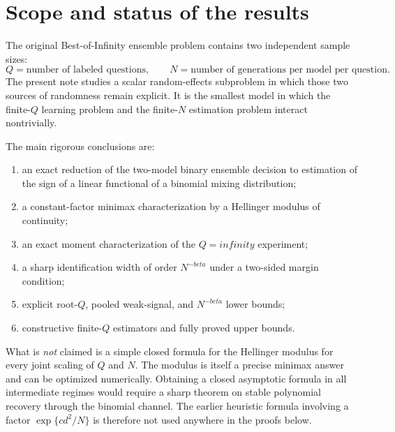 \documentclass[11pt]{article}
\def\beta{beta}%
\def\infty{infinity}%
\begin{document}
\tableofcontents

\section{Scope and status of the results}

The original Best-of-Infinity ensemble problem contains two independent sample sizes:
\[
Q=\text{number of labeled questions},\qquad
N=\text{number of generations per model per question}.
\]
The present note studies a scalar random-effects subproblem in which those two sources of randomness remain explicit.  It is the smallest model in which the finite-$Q$ learning problem and the finite-$N$ estimation problem interact nontrivially.

The main rigorous conclusions are:
\begin{enumerate}[label=(\roman*)]
\item an exact reduction of the two-model binary ensemble decision to estimation of the sign of a linear functional of a binomial mixing distribution;
\item a constant-factor minimax characterization by a Hellinger modulus of continuity;
\item an exact moment characterization of the $Q=\infty$ experiment;
\item a sharp identification width of order $N^{-\beta}$ under a two-sided margin condition;
\item explicit root-$Q$, pooled weak-signal, and $N^{-\beta}$ lower bounds;
\item constructive finite-$Q$ estimators and fully proved upper bounds.
\end{enumerate}

What is \emph{not} claimed is a simple closed formula for the Hellinger modulus for every joint scaling of $Q$ and $N$.  The modulus is itself a precise minimax answer and can be optimized numerically.  Obtaining a closed asymptotic formula in all intermediate regimes would require a sharp theorem on stable polynomial recovery through the binomial channel.  The earlier heuristic formula involving a factor $\exp\{c d^2/N\}$ is therefore not used anywhere in the proofs below.
\end{document}
